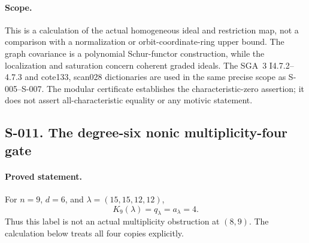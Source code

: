 \paragraph{Scope.}
This is a calculation of the actual homogeneous ideal and restriction
map, not a comparison with a normalization or orbit-coordinate-ring
upper bound.  The graph covariance is a polynomial Schur-functor
construction, while the localization and saturation concern coherent
graded ideals.  The SGA~3 I4.7.2--4.7.3 and cote133, scan028
dictionaries are used in the same precise scope as S-005--S-007.
The modular certificate establishes the characteristic-zero assertion;
it does not assert all-characteristic equality or any motivic statement.


\subsection{S-011. The degree-six nonic multiplicity-four gate}
\paragraph{Proved statement.}
For $n=9$, $d=6$, and $\lambda=(15,15,12,12)$,
\[
                    K_9(\lambda)=q_\lambda=a_\lambda=4.
\tag{S-011.1}
\]
Thus this label is not an actual multiplicity obstruction at $(8,9)$.
The calculation below treats all four copies explicitly.

